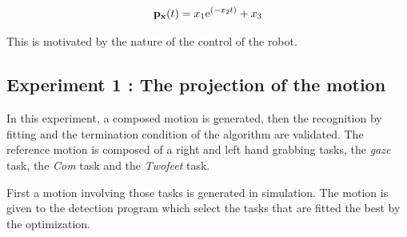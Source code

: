 \documentclass[letterpaper, 10pt, conference]{ieeeconf}      %
\begin{document}
\begin{equation}
{\mathbf{p}}_{{\mathbf{x}}}(t) = x_1 \mathrm{e}^{(-x_2 t)} + x_3
\label{eqTask}
\end{equation}

This is motivated by the nature of the control of the
robot.\\

\subsection{Experiment 1 : The projection of the motion}
In this experiment, a composed motion is generated, then the recognition by fitting
and the termination condition of the algorithm are validated.
The reference motion is composed of a right and left hand grabbing tasks,
the \emph{gaze} task, the \emph{Com} task and the \emph{Twofeet} task.

First a motion involving those tasks is generated in simulation.
The motion is given to the detection program
which select the tasks that are fitted the best by the optimization.
\end{document}
